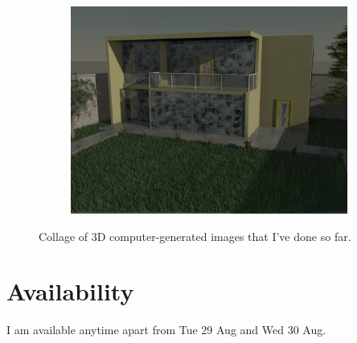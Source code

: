 \documentclass[11pt,a4paper]{article}
\begin{document}
\begin{figure}[H]
 \begin{subfigure}{0.47\textwidth}
 \centering
  \includegraphics[width=\textwidth]{images/house2}
 \end{subfigure}
 
 
 
 \caption{Collage of 3D computer-generated images that I've done so far.}
\end{figure}




\section*{Availability}

I am available anytime apart from Tue 29 Aug and Wed 30 Aug. 
\end{document}
